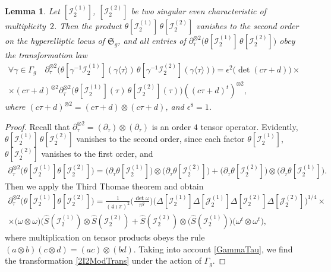 \documentclass[twoside]{amsart}
\newcommand{\I}{\mathcal{I}}
\newcommand{\J}{\mathcal{J}}
\newtheorem{lemma}{Lemma}[section]
\theoremstyle{definition}
\theoremstyle{plain}
\begin{document}
\begin{lemma}\label{CMF2I2}
Let $[\I_2^{(1)}]$, $[\I_2^{(2)}]$ be  two singular even characteristic of multiplicity~$2$.
Then the product $\theta [\I_2^{(1)} ]\,  \theta [\I_2^{(2)} ]$ vanishes to the second order 
on the hyperelliptic locus of $\mathfrak{S}_g$, and all entries of 
$\partial^{\otimes 2}_{\tau} \big(\theta [\I_2^{(1)} ]\,  \theta [\I_2^{(2)} ]\big)$ 
obey the  transformation law
\begin{multline}\label{2I2ModTrans}
\forall \gamma \in \Gamma_g \quad \partial^{\otimes 2}_{\tau} 
\big(\theta [\gamma^{-1} \I_2^{(1)}](\gamma \langle \tau \rangle)  
\,\theta [\gamma^{-1} \I_2^{(2)}] (\gamma \langle \tau \rangle) \big) = 
\epsilon^2 \big(\!\det (c \tau+d) \big) \times \\ \times
  (c \tau+d)^{\otimes 2} \partial^{\otimes 2}_{\tau} \big(\theta [\I_2^{(1)}](\tau)
\,\theta [\I_2^{(2)}] (\tau) \big)
((c \tau+d)^t)^{\otimes 2},
\end{multline}
where  $(c \tau+d)^{\otimes 2}= (c \tau+d) \otimes (c \tau+d)$, and $\epsilon^8=1$.
\end{lemma}
\begin{proof}
Recall that  $\partial^{\otimes 2}_{\tau} = (\partial_\tau) \otimes (\partial_\tau)$
is an order $4$ tensor operator.
Evidently, $\theta [\I_2^{(1)} ]\,  \theta [\I_2^{(2)} ]$ vanishes to the second order, 
since each factor
$\theta[\I_2^{(1)}]$, $\theta[\I_2^{(2)}]$ vanishes to the first order, and
\begin{gather*}
\partial^{\otimes 2}_{\tau}\big(\theta[\I_2^{(1)}] \theta[\I_2^{(2)}] \big) = 
\big(\partial_\tau \theta[\I_2^{(1)}]\big) \otimes \big( \partial_\tau \theta[\I_2^{(2)}]\big) 
+ \big(\partial_\tau \theta[\I_2^{(2)}]\big) \otimes \big( \partial_\tau \theta[\I_2^{(1)}]\big).
\end{gather*}
Then we apply  the Third Thomae theorem and obtain
\begin{multline}\label{GSThomae2Sng}
\partial^{\otimes 2}_{\tau}\big(\theta[\I_2^{(1)}] \theta[\I_2^{(2)}] \big) =
\frac{1}{(4\imath \pi)^2} 
\Big(\frac{\det \omega}{\pi^g}\Big)
\big(\Delta[\I_2^{(1)}] \Delta[\J_2^{(1)}] \Delta[\I_2^{(2)}] \Delta[\J_2^{(2)}]\big)^{1/4} \times \\ 
\times \big(\omega \otimes \omega\big)
\Big( \hat{S}(\I_2^{(1)}) \otimes  \hat{S}(\I_2^{(2)}) 
+  \hat{S}(\I_2^{(2)}) \otimes \big(\hat{S}(\I_2^{(1)}) \Big) \big(\omega^t \otimes \omega^t\big),
\end{multline}
where multiplication on tensor products obeys the rule $(a\otimes b) (c \otimes d) = (a c) \otimes (bd)$.
Taking into account \eqref{GammaTau}, 
we find the transformation \eqref{2I2ModTrans} under the action of $\Gamma_g$.
\end{proof}
\end{document}
